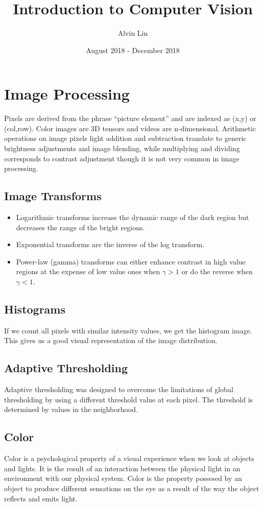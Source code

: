 \documentclass{math}
\title{Introduction to Computer Vision}
\author{Alvin Lin}
\date{August 2018 - December 2018}
\begin{document}
\maketitle

\section*{Image Processing}
Pixels are derived from the phrase ``picture element'' and are indexed as
(x,y) or (col,row). Color images are 3D tensors and videos are n-dimensional.
Arithmetic operations on image pixels light addition and subtraction translate
to generic brightness adjustments and image blending, while multiplying and
dividing corresponds to contrast adjustment though it is not very common in
image processing.

\subsection*{Image Transforms}
\begin{itemize}
  \item Logarithmic transforms increase the dynamic range of the dark region but
    decreases the range of the bright regions.
  \item Exponential transforms are the inverse of the log transform.
  \item Power-law (gamma) transforms can either enhance contrast in high value
    regions at the expense of low value ones when \( \gamma > 1 \) or do the
    reverse when \( \gamma < 1 \).
\end{itemize}

\subsection*{Histograms}
If we count all pixels with similar intensity values, we get the histogram
image. This gives us a good visual representation of the image distribution.

\subsection*{Adaptive Thresholding}
Adaptive thresholding was designed to overcome the limitations of global
thresholding by using a different threshold value at each pixel. The threshold
is determined by values in the neighborhood.

\subsection*{Color}
Color is a psychological property of a visual experience when we look at
objects and lights. It is the result of an interaction between the physical
light in an environment with our physical system. Color is the property
possesed by an object to produce different sensations on the eye as a result
of the way the object reflects and emits light.
\end{document}
